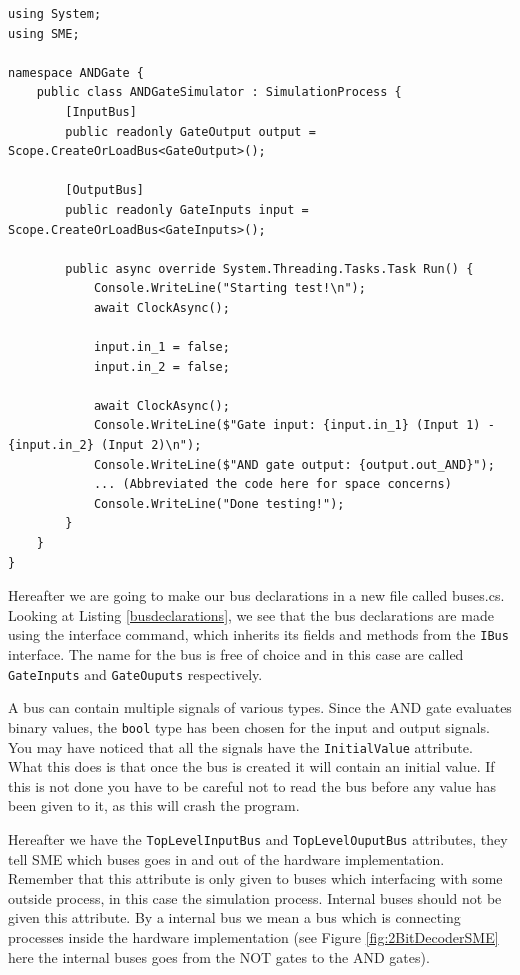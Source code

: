 \begin{lstlisting}[language={[Sharp]C}, caption={The simulator file, which specifies how the simulation is run. Most lines in the run method are concatenated brievity.},captionpos=b, label = simulatorfile]
using System;
using SME;

namespace ANDGate {
    public class ANDGateSimulator : SimulationProcess {
        [InputBus]
        public readonly GateOutput output = Scope.CreateOrLoadBus<GateOutput>();
        
        [OutputBus]
        public readonly GateInputs input = Scope.CreateOrLoadBus<GateInputs>();
        
        public async override System.Threading.Tasks.Task Run() {
            Console.WriteLine("Starting test!\n");
            await ClockAsync();
            
            input.in_1 = false;
            input.in_2 = false;
            
            await ClockAsync();
            Console.WriteLine($"Gate input: {input.in_1} (Input 1) - {input.in_2} (Input 2)\n");
            Console.WriteLine($"AND gate output: {output.out_AND}");
            ... (Abbreviated the code here for space concerns)
            Console.WriteLine("Done testing!");
        }
    }
}
\end{lstlisting}
\newpage
        Hereafter we are going to make our bus declarations in a new file called buses.cs. Looking at Listing \ref{busdeclarations}, we see that the bus declarations are made using the interface command, which inherits its fields and methods from the \texttt{IBus} interface. The name for the bus is free of choice and in this case are called \texttt{GateInputs} and \texttt{GateOuputs} respectively.
        
        A bus can contain multiple signals of various types. Since the AND gate evaluates binary values, the \texttt{bool} type has been chosen for the input and output signals. You may have noticed that all the signals have the \texttt{InitialValue} attribute. What this does is that once the bus is created it will contain an initial value. If this is not done you have to be careful not to read the bus before any value has been given to it, as this will crash the program.
        
        Hereafter we have the \texttt{TopLevelInputBus} and \texttt{TopLevelOuputBus} attributes, they tell SME which buses goes in and out of the hardware implementation. Remember that this attribute is only given to buses which interfacing with some outside process, in this case the simulation process. Internal buses should not be given this attribute. By a internal bus we mean a bus which is connecting processes inside the hardware implementation (see Figure \ref{fig:2BitDecoderSME} here the internal buses goes from the NOT gates to the AND gates).

